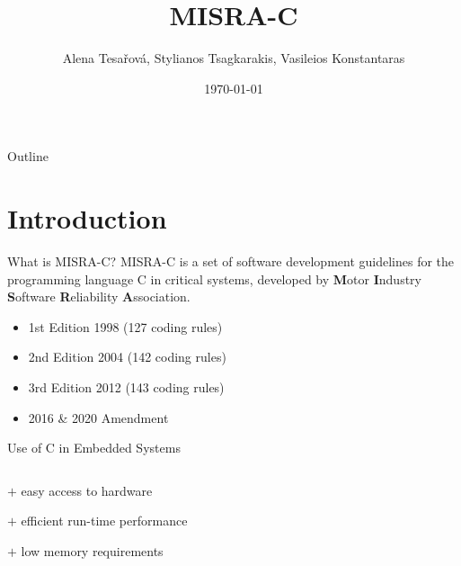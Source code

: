 \documentclass[t]{beamer} %
\title[SEMB/SETR]{MISRA-C}
\author{Alena Tesařová, Stylianos Tsagkarakis, Vasileios Konstantaras}
\institute{Faculty of Engineering of the University of Porto}
\date{\today}
\begin{document}
\begin{frame}
    \titlepage
\end{frame}

\begin{frame}{Outline}
    \tableofcontents
\end{frame}

\section{Introduction}

\begin{frame}{What is MISRA-C?}
  		     MISRA-C is a set of software development guidelines for the programming language C in critical systems, developed by \textbf{M}otor \textbf{I}ndustry \textbf{S}oftware \textbf{R}eliability \textbf{A}ssociation.
  		        \begin{itemize}
  		            \item 1st Edition 1998 (127 coding rules)
  		            \item 2nd Edition 2004 (142 coding rules)
  		            \item 3rd Edition 2012 (143 coding rules)
  		            \item 2016 \& 2020 Amendment
  		        \end{itemize}
  		        \begin{block}{ Use of C in Embedded Systems}
     		        \begin{columns}
     		            \begin{itemize}
                            \begin{footnotesize}
          		                \item[$+$] easy access to hardware
          		                \item[$+$] efficient run-time performance
          		                \item[$+$] low memory requirements
                        \end{footnotesize}
                    \end{itemize}
                        \begin{footnotesize}

\end{footnotesize}
\end{columns}
\end{block}
\end{frame}
\end{document}
